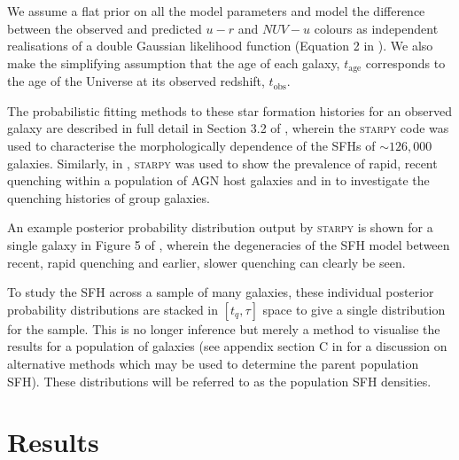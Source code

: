 \documentclass[useAMS,usenatbib]{mn2e}
\begin{document}
We assume a flat prior on all the model parameters and model the difference between the observed and predicted $u-r$ and $NUV-u$ colours as independent realisations of a double Gaussian likelihood function (Equation 2 in \citealt{smethurst15}). We also make the simplifying assumption that the age of each galaxy, $t_\mathrm{age}$ corresponds to the age of the Universe at its observed redshift, $t_\mathrm{obs}$.

The probabilistic fitting methods to these star formation histories for an observed galaxy are described in full detail in Section 3.2 of \cite{smethurst15}, wherein the \textsc{starpy} code was used to characterise the morphologically dependence of the SFHs of $\sim126,000$ galaxies. Similarly, in \cite{smethurst16}, \textsc{starpy} was used to show the prevalence of rapid, recent quenching within a population of AGN host galaxies and in \cite{smethurst17} to investigate the quenching histories of group galaxies. 


An example posterior probability distribution output by \textsc{starpy} is shown for a single galaxy in Figure 5 of \cite{smethurst15}, wherein the degeneracies of the SFH model between recent, rapid quenching and earlier, slower quenching can clearly be seen. 

To study the SFH across a sample of many galaxies, these individual posterior probability distributions are stacked in $[t_q, \tau]$ space to give a single distribution for the sample. This is no longer inference but merely a method to visualise the results for a population of galaxies (see appendix section C in \citealt{smethurst16} for a discussion on alternative methods which may be used to determine the parent population SFH). These distributions will be referred to as the population SFH densities.

\section{Results}\label{sec:results}
\end{document}

